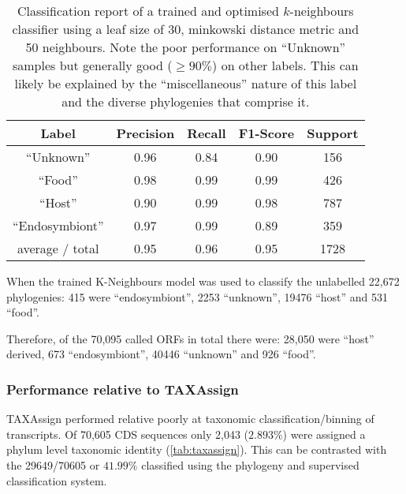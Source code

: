 \begin{table}
    \centering
	\begin{tabular}{|c|c|c|c|c|}
		\hline
		\textbf{Label} & \textbf{Precision} & \textbf{Recall} & \textbf{F1-Score} & \textbf{Support} \\
		\hline
		``Unknown'' & 0.96 & 0.84 & 0.90 & 156 \\
		``Food'' & 0.98 & 0.99 & 0.99 & 426 \\
		``Host'' & 0.90 & 0.99 & 0.98 & 787 \\
		``Endosymbiont'' &  0.97 & 0.99 & 0.89 & 359 \\
		\hline
		average / total & 0.95 & 0.96 & 0.95 & 1728 \\
		\hline 
	\end{tabular}
    \caption[Classification report for \(k\)-neighbours]{Classification report of a trained and optimised 
    \(k\)-neighbours classifier using a leaf size of 30, minkowski
	distance metric and 50 neighbours.  Note the poor performance
	on ``Unknown'' samples but generally good (\(\geq90\%\)) on
	other labels. This can likely be explained by the ``miscellaneous''
nature of this label and the diverse phylogenies that comprise it. }
\label{tab:classification_report}
\end{table} 

When the trained K-Neighbours model was used to classify 
the unlabelled 22,672 phylogenies: 415 were ``endosymbiont'',
2253 ``unknown'', 19476 ``host'' and 531 ``food''. 

Therefore, of the 70,095 called ORFs in total there were:
28,050 were ``host'' derived,  
673 ``endosymbiont'',  40446 ``unknown'' and 926 ``food''.

\subsubsection{Performance relative to TAXAssign}

TAXAssign performed relative poorly at taxonomic classification/binning
of transcripts.  Of 70,605 CDS sequences only
2,043 (\(2.893\%\)) were assigned a phylum level taxonomic identity (\cref{tab:taxassign}). This can be contrasted with the 29649/70605 or \(41.99\%\) classified 
using the phylogeny and supervised classification system.

